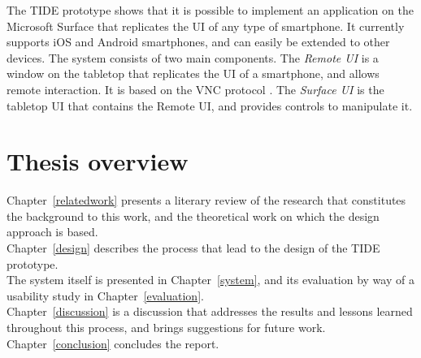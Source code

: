 The TIDE prototype shows that it is possible to implement an application on the Microsoft Surface that replicates the UI of any type of smartphone.
It currently supports iOS and Android smartphones, and can easily be extended to other devices.
The system consists of two main components.
The \emph{Remote UI} is a window on the tabletop that replicates the UI of a smartphone, and allows remote interaction.
It is based on the VNC protocol \citep{Richardson:1998:vnc}.
The \emph{Surface UI} is the tabletop UI that contains the Remote UI, and provides controls to manipulate it.

\section{Thesis overview}

Chapter~\ref{relatedwork} presents a literary review of the research that constitutes the background to this work, and the theoretical work on which the design approach is based.\\
Chapter~\ref{design} describes the process that lead to the design of the TIDE prototype.\\
The system itself is presented in Chapter~\ref{system}, and its evaluation by way of a usability study in Chapter~\ref{evaluation}.\\
Chapter~\ref{discussion} is a discussion that addresses the results and lessons learned throughout this process, and brings suggestions for future work.\\
Chapter~\ref{conclusion} concludes the report.


